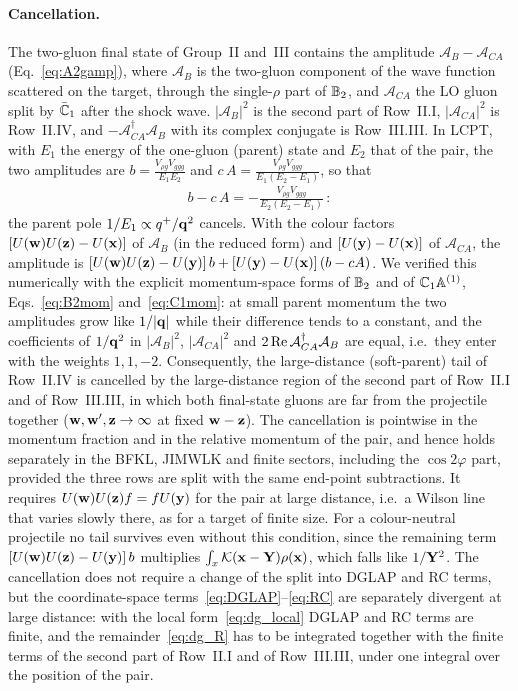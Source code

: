 \paragraph{Cancellation.} The two-gluon final state of Group~II and~III contains the amplitude $\mathcal A_B-\mathcal A_{CA}$ (Eq.~\eqref{eq:A2gamp}), where $\mathcal A_B$ is the two-gluon component of the wave function scattered on the target, through the single-$\rho$ part of $\mathbb{B}_2$, and $\mathcal A_{CA}$ the LO gluon split by $\bar{\mathbb{C}}_1$ after the shock wave. $|\mathcal A_B|^2$ is the second part of Row~II.I, $|\mathcal A_{CA}|^2$ is Row~II.IV, and $-\mathcal A^\dagger_{CA}\mathcal A_B$ with its complex conjugate is Row~III.III. In LCPT, with $E_1$ the energy of the one-gluon (parent) state and $E_2$ that of the pair, the two amplitudes are $b=\frac{V_{\rho g}V_{ggg}}{E_1E_2}$ and $c\,A=\frac{V_{\rho g}V_{ggg}}{E_1(E_2-E_1)}$, so that
\begin{align}\label{eq:dg_bcA}
b-c\,A=-\frac{V_{\rho g}V_{ggg}}{E_2(E_2-E_1)}\,:
\end{align}
the parent pole $1/E_1\propto q^+/\mathbf{q}^2$ cancels. With the colour factors $[U(\mathbf{w})U(\mathbf{z})-U(\mathbf{x})]$ of $\mathcal A_B$ (in the reduced form) and $[U(\mathbf{y})-U(\mathbf{x})]$ of $\mathcal A_{CA}$, the amplitude is $[U(\mathbf{w})U(\mathbf{z})-U(\mathbf{y})]\,b+[U(\mathbf{y})-U(\mathbf{x})]\,(b-cA)$. We verified this numerically with the explicit momentum-space forms of $\mathbb{B}_2$ and of $\mathbb{C}_1\mathbb{A}^{(1)}$, Eqs.~\eqref{eq:B2mom} and~\eqref{eq:C1mom}: at small parent momentum the two amplitudes grow like $1/|\mathbf{q}|$ while their difference tends to a constant, and the coefficients of $1/\mathbf{q}^2$ in $|\mathcal A_B|^2$, $|\mathcal A_{CA}|^2$ and $2\,{\rm Re}\,\mathcal A_{CA}^\dagger\mathcal A_B$ are equal, i.e.\ they enter with the weights $1,1,-2$. Consequently, the large-distance (soft-parent) tail of Row~II.IV is cancelled by the large-distance region of the second part of Row~II.I and of Row~III.III, in which both final-state gluons are far from the projectile together ($\mathbf{w},\mathbf{w}',\mathbf{z}\to\infty$ at fixed $\mathbf{w}-\mathbf{z}$). The cancellation is pointwise in the momentum fraction and in the relative momentum of the pair, and hence holds separately in the BFKL, JIMWLK and finite sectors, including the $\cos2\varphi$ part, provided the three rows are split with the same end-point subtractions. It requires $U(\mathbf{w})U(\mathbf{z})f=fU(\mathbf{y})$ for the pair at large distance, i.e.\ a Wilson line that varies slowly there, as for a target of finite size. For a colour-neutral projectile no tail survives even without this condition, since the remaining term $[U(\mathbf{w})U(\mathbf{z})-U(\mathbf{y})]\,b$ multiplies $\int_x\mathcal{K}(\mathbf{x}-\mathbf{Y})\rho(\mathbf{x})$, which falls like $1/\mathbf{Y}^2$. The cancellation does not require a change of the split into DGLAP and RC terms, but the coordinate-space terms~\eqref{eq:DGLAP}--\eqref{eq:RC} are separately divergent at large distance: with the local form~\eqref{eq:dg_local} DGLAP and RC terms are finite, and the remainder~\eqref{eq:dg_R} has to be integrated together with the finite terms of the second part of Row~II.I and of Row~III.III, under one integral over the position of the pair. 
